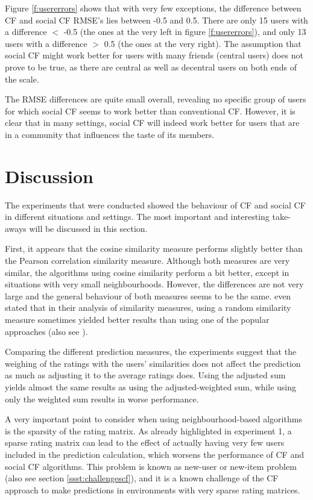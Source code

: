 Figure \ref{f:usererrors} shows that with very few exceptions, the difference between CF and social CF RMSE's lies between -0.5 and 0.5. There are only 15 users with a difference $<$ -0.5 (the ones at the very left in figure \ref{f:usererrors}), and only 13 users with a difference $>$ 0.5 (the ones at the very right). The assumption that social CF might work better for users with many friends (central users) does not prove to be true, as there are central as well as decentral users on both ends of the scale.

The RMSE differences are quite small overall, revealing no specific group of users for which social CF seems to work better than conventional CF. However, it is clear that in many settings, social CF will indeed work better for users that are in a community that influences the taste of its members.
\section{Discussion}
\label{st:discussion} The experiments that were conducted showed the behaviour of CF and social CF in different situations and settings. The most important and interesting take-aways will be discussed in this section.
\newline

First, it appears that the cosine similarity measure performs slightly better than the Pearson correlation similarity measure. Although both measures are very similar, the algorithms using cosine similarity perform a bit better, except in situations with very small neighbourhoods. However, the differences are not very large and the general behaviour of both measures seems to be the same. \cite{Lathia_2008} even stated that in their analysis of similarity measures, using a random similarity measure sometimes yielded better results than using one of the popular approaches (also see \cite{Amatriain_2011}).

Comparing the different prediction measures, the experiments suggest that the weighing of the ratings with the users' similarities does not affect the prediction as much as adjusting it to the average ratings does. Using the adjusted sum yields almost the same results as using the adjusted-weighted sum, while using only the weighted sum results in worse performance.

A very important point to consider when using neighbourhood-based algorithms is the sparsity of the rating matrix. As already highlighted in experiment 1, a sparse rating matrix can lead to the effect of actually having very few users included in the prediction calculation, which worsens the performance of CF and social CF algorithms. This problem is known as new-user or new-item problem (also see section \ref{ssst:challengescf}), and it is a known challenge of the CF approach to make predictions in environments with very sparse rating matrices.

